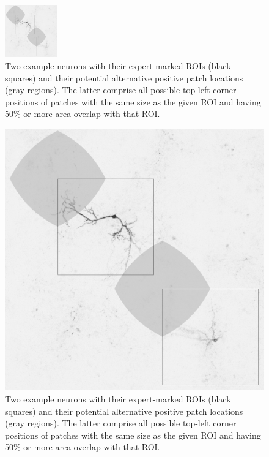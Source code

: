 \begin{figure}
	\centering
	\includegraphics[width=0.2\textwidth]{fig02}
	\caption{Two example neurons with their expert-marked ROIs (black squares) and their potential alternative positive patch locations (gray regions). The latter comprise all possible top-left corner positions of patches with the same size as the given ROI and having 50\% or more area overlap with that ROI.}
	\label{fig:neuronROI}
\end{figure}
\begin{figure}
	\begin{minipage}{0.4\textwidth}
		\includegraphics[width=\textwidth]{fig02}
	\end{minipage}
	\hspace{0.02\textwidth}
	\begin{minipage}{0.55\textwidth}
		\vspace{-4.5em}
		\caption{Two example neurons with their expert-marked ROIs (black squares) and their potential alternative positive patch locations (gray regions). The latter comprise all possible top-left corner positions of patches with the same size as the given ROI and having 50\% or more area overlap with that ROI.}
		\label{fig:neuronROI}
	\end{minipage}
\end{figure}

